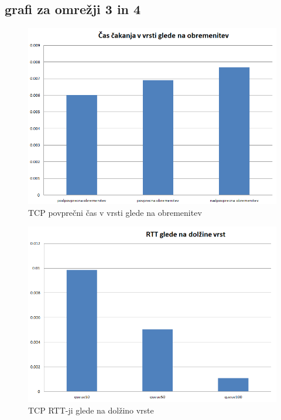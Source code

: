 \documentclass[11pt, a4paper, slovene]{book}
\begin{document}
\subsection{grafi za omrežji 3 in 4}

\begin{figure}[h]
	\centering
	\includegraphics[width=\textwidth]{TCP_cas_vrsta_obremenitev.png}
	\caption{TCP povprečni čas v vrsti glede na obremenitev}
	\label{1}	
\end{figure}


\begin{figure}[h]
	\centering
	\includegraphics[width=\textwidth]{TCP_RTT_dolzine_vrst.png}
	\caption{TCP RTT-ji glede na dolžino vrste}
	\label{2}	
\end{figure}
\end{document}
